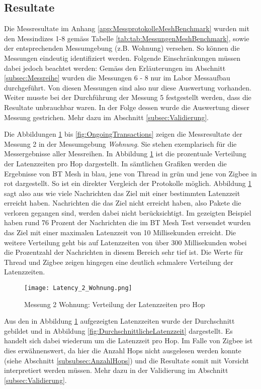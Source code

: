 \subsection{Resultate}\label{subsec:Resultate}
Die Messresultate im Anhang \ref{app:MessprotokolleMeshBenchmark} wurden mit den Messindizes 1-8 gemäss Tabelle \ref{tab:tab:MessungenMeshBenchmark}, sowie der entsprechenden Messumgebung (z.B. Wohnung) versehen.
So können die Messungen eindeutig identifiziert werden.
Folgende Einschränkungen müssen dabei jedoch beachtet werden:
Gemäss den Erläuterungen im Abschnitt \ref{subsec:Messreihe} wurden die Messungen 6 - 8 nur im Labor Messaufbau durchgeführt. Von diesen Messungen sind also nur diese Auswertung vorhanden.
Weiter musste bei der Durchführung der Messung 5 festgestellt werden, dass die Resultate unbrauchbar waren.
In der Folge dessen wurde die Auswertung dieser Messung gestrichen. Mehr dazu im Abschnitt  \ref{subsec:Validierung}.


Die Abbildungen \ref{fig:VerteilungderLatenzzeiten} bis \ref{fig:OngoingTransactions} zeigen die Messresultate der Messung 2 in der Messumgebung \textit{Wohnung}. Sie stehen exemplarisch für die Messergebnisse aller Messreihen.
In Abbildung \ref{fig:VerteilungderLatenzzeiten} ist die prozentuale Verteilung der Latenzzeiten pro Hop dargestellt.
In sämtlichen Grafiken werden die Ergebnisse von BT Mesh in blau, jene von Thread in grün und jene von Zigbee in rot dargestellt.
So ist ein direkter Vergleich der Protokolle möglich.
Abbildung \ref{fig:VerteilungderLatenzzeiten} sagt also aus wie viele Nachrichten das Ziel mit einer bestimmten Latenzzeit erreicht haben.
Nachrichten die das Ziel nicht erreicht haben, also Pakete die verloren gegangen sind, werden dabei nicht berücksichtigt.
Im gezeigten Beispiel haben rund 76 Prozent der Nachrichten die im BT Mesh Test versendet wurden das Ziel mit einer maximalen Latenzzeit von 10 Millisekunden erreicht.
Die weitere Verteilung geht bis auf Latenzzeiten von über 300 Millisekunden wobei die Prozentzahl der Nachrichten in diesem Bereich sehr tief ist.
Die Werte für Thread und Zigbee zeigen hingegen eine deutlich schmalere Verteilung der Latenzzeiten.

\begin{figure}[h]
	\centering
	\texttt{[image: Latency\_2\_Wohnung.png]}
	\caption{Messung 2 Wohnung: Verteilung der Latenzzeiten pro Hop}
	\label{fig:VerteilungderLatenzzeiten}
\end{figure}

Aus den in Abbildung \ref{fig:VerteilungderLatenzzeiten} aufgezeigten Latenzzeiten wurde der Durchschnitt gebildet und in Abbildung \ref{fig:DurchschnittlicheLatenzzeit} dargestellt.
Es handelt sich dabei wiederum um die Latenzzeit pro Hop. Im Falle von Zigbee ist dies erwähnenswert, da hier die Anzahl Hops nicht ausgelesen werden konnte (siehe Abschnitt \ref{subsubsec:AnzahlHops}) und die Resultate somit mit Vorsicht interpretiert werden müssen. Mehr dazu in der Validierung im Abschnitt \ref{subsec:Validierung}.

